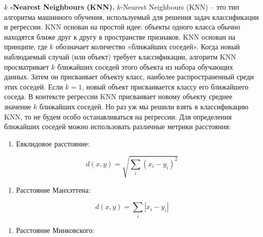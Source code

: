 \begin{multicols}{2}
$k$ {\bfseries -Nearest Neighbours (KNN).}
$k$-Nearest Neighbours (KNN) -- это тип
алгоритма машинного обучения, используемый для решения задач
классификации и регрессии. KNN основан на простой идее: объекты одного
класса обычно находятся ближе друг к другу в пространстве признаков. KNN
основан на принципе, где $k$ обозначает
количество «ближайших соседей». Когда новый наблюдаемый случай (или
объект) требует классификации, алгоритм KNN просматривает $k$ ближайших соседей этого объекта из
набора обучающих данных. Затем он присваивает объекту класс, наиболее
распространенный среди этих соседей. Если $k=1$, новый объект присваивается классу его ближайшего соседа. В контексте регрессии KNN присваивает новому
объекту среднее значение $k$ ближайших
соседей. Но раз уж мы решили взять в классификацию KNN, то не будем
особо останавливаться на регрессии. Для определения ближайших соседей
можно использовать различные метрики расстояния:
\end{multicols}

\begin{enumerate}
\def\labelenumi{\arabic{enumi}.}
\item
  Евклидовое расстояние:
\end{enumerate}
\begin{equation}
	d(x,y)=\sqrt{\sum_{i} (x_i-y_i)^2}
\end{equation}

\begin{enumerate}
\def\labelenumi{\arabic{enumi}.}
\setcounter{enumi}{1}
\item
  Расстояние Манхэттена:
\end{enumerate}
\begin{equation}
	d(x,y)=\sum_{i} |x_i - y_i|
\end{equation}

\begin{enumerate}
\def\labelenumi{\arabic{enumi}.}
\setcounter{enumi}{2}
\item
  Расстояние Минковского:
\end{enumerate}

